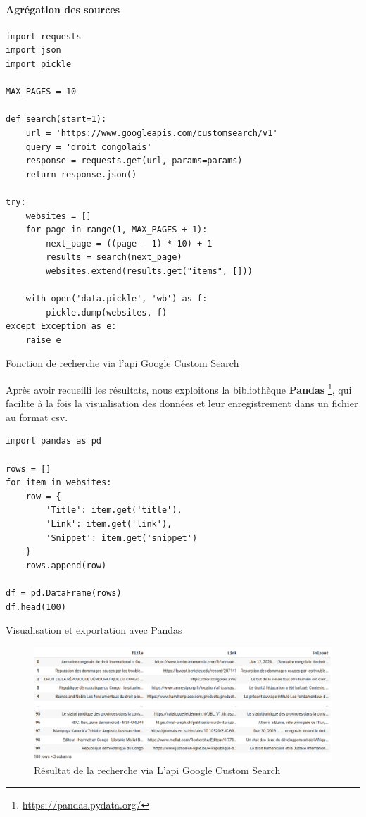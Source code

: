 \paragraph{Agrégation des sources} \hspace{0pt}

\begin{listing}[!ht]
\begin{verbatim}
import requests
import json
import pickle

MAX_PAGES = 10

def search(start=1):
    url = 'https://www.googleapis.com/customsearch/v1'
    query = 'droit congolais'
    response = requests.get(url, params=params)
    return response.json()

try:
    websites = []
    for page in range(1, MAX_PAGES + 1):
        next_page = ((page - 1) * 10) + 1
        results = search(next_page)
        websites.extend(results.get("items", []))

    with open('data.pickle', 'wb') as f:
        pickle.dump(websites, f)
except Exception as e:
    raise e
\end{verbatim}
\caption{Fonction de recherche via l'\acs{api} Google Custom Search}
\label{appendix:code:python:search-google-function}
\end{listing}

Après avoir recueilli les résultats, nous exploitons la bibliothèque \textbf{Pandas} \footnote{\href{https://pandas.pydata.org/}{https://pandas.pydata.org/}}, qui facilite à la fois la visualisation des données et leur enregistrement dans un fichier au format \ac{csv}.

\begin{listing}[!ht]
\begin{verbatim}
import pandas as pd 

rows = []
for item in websites:
    row = {
        'Title': item.get('title'),
        'Link': item.get('link'),
        'Snippet': item.get('snippet')
    }
    rows.append(row)

df = pd.DataFrame(rows)
df.head(100)
\end{verbatim}
\caption{Visualisation et exportation avec Pandas}
\label{appendix:code:python:search-google-visualization}
\end{listing}


\begin{figure}[H]
    \centering
    \includegraphics[width=15cm]{gfx/fig-google-search-result.png}
    \caption{Résultat de la recherche via L'\acs{api} Google Custom Search}
    \label{fig:google-search-result}
\end{figure}

